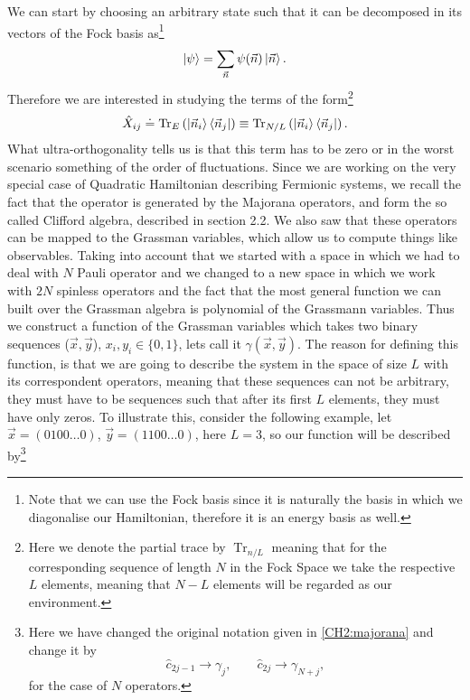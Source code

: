 \indent We can start by choosing an arbitrary state such that it can be decomposed in its vectors of the Fock basis as\footnote{Note that we can use the Fock basis since it is naturally the basis in which we diagonalise our Hamiltonian, therefore it is an energy basis as well.}
\begin{equation}
\mathinner{|{\psi}\rangle} = \sum_{\vec{n}}\psi(\vec{n})\mathinner{|{\vec{n}}\rangle}.
\end{equation}
Therefore we are interested in studying the terms of the form\footnote{Here we denote the partial trace by $\operatorname{Tr}_{n/L}$ meaning that for the corresponding sequence of length $N$ in the Fock Space we take the respective $L$ elements, meaning that $N-L$ elements will be regarded as our environment.}
\begin{equation}
\hat{X}_{ij} \doteq \operatorname{Tr}_{E}\left(\mathinner{|{\vec{n}_i}\rangle}\mathinner{\langle{\vec{n}_j}|}\right) \equiv \operatorname{Tr}_{N/L}\left(\mathinner{|{\vec{n}_i}\rangle}\mathinner{\langle{\vec{n}_j}|}\right).
\end{equation}
\indent What ultra-orthogonality tells us is that this term has to be zero or in the worst scenario something of the order of fluctuations. Since we are working on the very special case of Quadratic Hamiltonian describing Fermionic systems, we recall the fact that the operator is generated by the Majorana operators, and form the so called Clifford algebra, described in section 2.2. We also saw that these operators can be mapped to the Grassman variables, which allow us to compute things like observables. Taking into account that we started with a space in which we had to deal with $N$ Pauli operator and we changed to a new space in which we work with $2N$ spinless operators and the fact that the most general  function we can built over the Grassman algebra is polynomial of the Grassmann variables. Thus we construct a function of the Grassman variables which takes two binary sequences ($\vec{x},\vec{y}$), $x_i,y_i \in \{0,1\}$, lets call it $\gamma(\vec{x},\vec{y})$. The reason for defining this function, is that we are going to describe the system in the space of size $L$ with its correspondent operators, meaning that these sequences can not be arbitrary, they must have to be sequences such that after its first $L$ elements, they must have only zeros. To illustrate this, consider the following example, let $\vec{x}=(0100\ldots 0)$, $\vec{y}=(1100\ldots 0)$, here $L=3$, so our function will be described by\footnote{Here we have changed the original notation given in \eqref{CH2:majorana} and change it by 
\begin{equation}
\hat{c}_{2j-1}\rightarrow \gamma_{j} , \qquad \hat{c}_{2j}\rightarrow \gamma_{N+j},
\end{equation}
for the case of $N$ operators.
}
